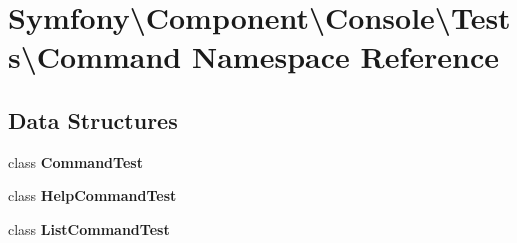 \section{Symfony\textbackslash{}Component\textbackslash{}Console\textbackslash{}Tests\textbackslash{}Command Namespace Reference}
\label{namespace_symfony_1_1_component_1_1_console_1_1_tests_1_1_command}
\subsection*{Data Structures}
\begin{DoxyCompactItemize}
\item 
class {\bf Command\+Test}
\item 
class {\bf Help\+Command\+Test}
\item 
class {\bf List\+Command\+Test}
\end{DoxyCompactItemize}
